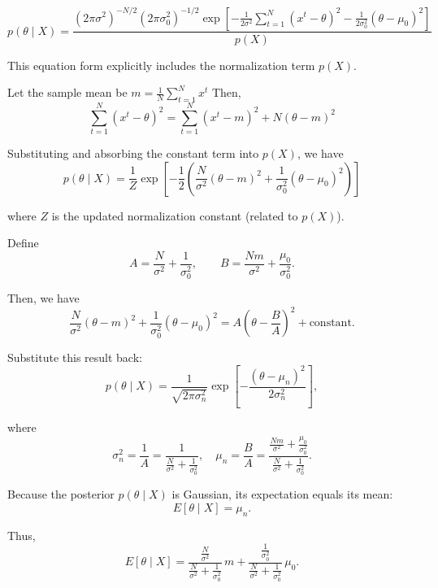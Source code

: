 \documentclass[12pt,a4paper]{article}
\begin{document}
\[
p(\theta \mid X)
= \frac{
(2\pi\sigma^2)^{-N/2}(2\pi\sigma_0^2)^{-1/2}
\exp\!\left[
-\frac{1}{2\sigma^2}\sum_{t=1}^{N}(x^t - \theta)^2
-\frac{1}{2\sigma_0^2}(\theta - \mu_0)^2
\right]
}{
p(X)
}
\]

This equation form explicitly includes the normalization term \(p(X)\).

Let the sample mean be
$
m = \frac{1}{N}\sum_{t=1}^N x^t
$
Then,
\[
\sum_{t=1}^N (x^t - \theta)^2
= \sum_{t=1}^N (x^t - m)^2 + N(\theta - m)^2
\]

Substituting and absorbing the constant term into \(p(X)\), we have
\[
p(\theta \mid X)
= \frac{1}{Z}
\exp\!\left[
-\frac{1}{2}
\left(
\frac{N}{\sigma^2}(\theta - m)^2
+ \frac{1}{\sigma_0^2}(\theta - \mu_0)^2
\right)
\right]
\]

where \(Z\) is the updated normalization constant (related to \(p(X)\)).

Define
\[
A = \frac{N}{\sigma^2} + \frac{1}{\sigma_0^2}, \qquad
B = \frac{N m}{\sigma^2} + \frac{\mu_0}{\sigma_0^2}.
\]

Then, we have
\[
\frac{N}{\sigma^2}(\theta - m)^2 + \frac{1}{\sigma_0^2}(\theta - \mu_0)^2
= A\!\left(\theta - \frac{B}{A}\right)^2 + \text{constant}.
\]

Substitute this result back:
\[
p(\theta \mid X)
= \frac{1}{\sqrt{2\pi\sigma_n^2}}
\exp\!\left[-\frac{(\theta - \mu_n)^2}{2\sigma_n^2}\right],
\]

where
$$
\sigma_n^2 = \frac{1}{A}
= \frac{1}{\tfrac{N}{\sigma^2} + \tfrac{1}{\sigma_0^2}},
\quad
\mu_n = \frac{B}{A}
= \frac{\tfrac{N m}{\sigma^2} + \tfrac{\mu_0}{\sigma_0^2}}
{\tfrac{N}{\sigma^2} + \tfrac{1}{\sigma_0^2}}.
$$

Because the posterior \(p(\theta \mid X)\) is Gaussian, its expectation equals its mean:
\[
E[\theta \mid X] = \mu_n.
\]

Thus,
\[
E[\theta \mid X]
= \frac{\tfrac{N}{\sigma^2}}{\tfrac{N}{\sigma^2} + \tfrac{1}{\sigma_0^2}}\,m
+ \frac{\tfrac{1}{\sigma_0^2}}{\tfrac{N}{\sigma^2} + \tfrac{1}{\sigma_0^2}}\,\mu_0.
\]
\end{document}

